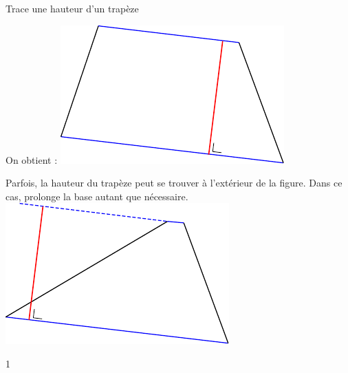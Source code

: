 \documentclass[a4paper,11pt]{report}
\let\oldcenter\center
\let\oldendcenter\endcenter
\renewenvironment{center}{\setlength\topsep{-10pt}\oldcenter}{\oldendcenter}
\begin{document}
\begin{resolu}{Trace une hauteur d'un trapèze}
{\begin{tasks}[column-sep=10pt]
    \task On obtient :
    \begin{center} \includegraphics[scale=0.9]{media/gm-01/trapeze4} \end{center}
\end{tasks}

Parfois, la hauteur du trapèze peut se trouver à l'extérieur de la figure. Dans ce cas, prolonge la base autant que nécessaire.
\begin{center} \includegraphics[]{media/gm-01/trapeze5} \end{center}

}{1}
\end{resolu}
\end{document}

